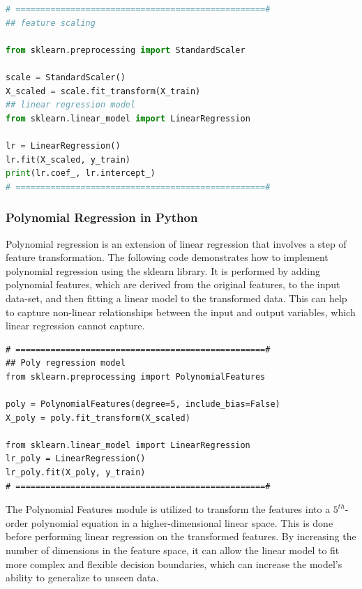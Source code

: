 {\begin{lstlisting}[language=Python]
# ==================================================#
## feature scaling

from sklearn.preprocessing import StandardScaler

scale = StandardScaler()
X_scaled = scale.fit_transform(X_train)
## linear regression model
from sklearn.linear_model import LinearRegression

lr = LinearRegression()
lr.fit(X_scaled, y_train)
print(lr.coef_, lr.intercept_)
# ==================================================#
\end{lstlisting}


\subsubsection{\textbf{Polynomial Regression in Python}}

Polynomial regression is an extension of linear regression that involves a step of feature transformation. The following code demonstrates how to implement polynomial regression using the sklearn library. It is performed by adding polynomial features, which are derived from the original features, to the input data-set, and then fitting a linear model to the transformed data. This can help to capture non-linear relationships between the input and output variables, which linear regression cannot capture.

\begin{lstlisting}
# ==================================================#
## Poly regression model
from sklearn.preprocessing import PolynomialFeatures

poly = PolynomialFeatures(degree=5, include_bias=False)
X_poly = poly.fit_transform(X_scaled)

from sklearn.linear_model import LinearRegression
lr_poly = LinearRegression()
lr_poly.fit(X_poly, y_train)
# ==================================================#
\end{lstlisting}

The Polynomial Features module is utilized to transform the features into a $5^{th}$-order polynomial equation in a higher-dimensional linear space. This is done before performing linear regression on the transformed features. By increasing the number of dimensions in the feature space, it can allow the linear model to fit more complex and flexible decision boundaries, which can increase the model's ability to generalize to unseen data.
}
